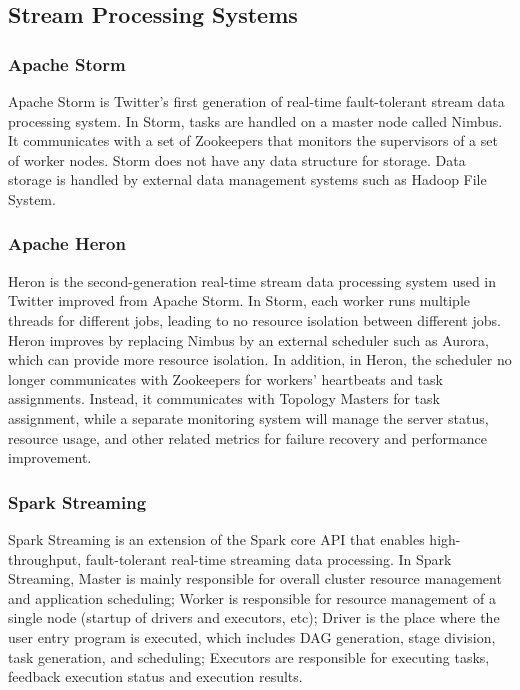 \documentclass[pdftex,twocolumn,10pt,letterpaper]{article}
\begin{document}
\subsection{Stream Processing Systems}

\subsubsection{Apache Storm}
Apache Storm is Twitter's first generation of real-time fault-tolerant stream data processing system. In Storm, tasks are handled on a master node called Nimbus. It communicates with a set of Zookeepers\cite{hunt2010zookeeper} that monitors the supervisors of a set of worker nodes. Storm does not have any data structure for storage. Data storage is handled by external data management systems such as Hadoop File System\cite{shvachko2010hadoop}. 

\subsubsection{Apache Heron}
Heron is the second-generation real-time stream data processing system used in Twitter improved from Apache Storm. In Storm, each worker runs multiple threads for different jobs, leading to no resource isolation between different jobs. Heron improves by replacing Nimbus by an external scheduler such as Aurora\cite{abadi2003aurora}, which can provide more resource isolation. In addition, in Heron, the scheduler no longer communicates with Zookeepers for workers' heartbeats and task assignments. Instead, it communicates with Topology Masters for task assignment, while a separate monitoring system will manage the server status, resource usage, and other related metrics for failure recovery and performance improvement. 

\subsubsection{Spark Streaming}

Spark Streaming is an extension of the Spark core API that enables high-throughput, fault-tolerant real-time streaming data processing. In Spark Streaming, Master is mainly responsible for overall cluster resource management and application scheduling; Worker is responsible for resource management of a single node (startup of drivers and executors, etc); Driver is the place where the user entry program is executed, which includes DAG generation, stage division, task generation, and scheduling; Executors are responsible for executing tasks, feedback execution status and execution results.
\end{document}
